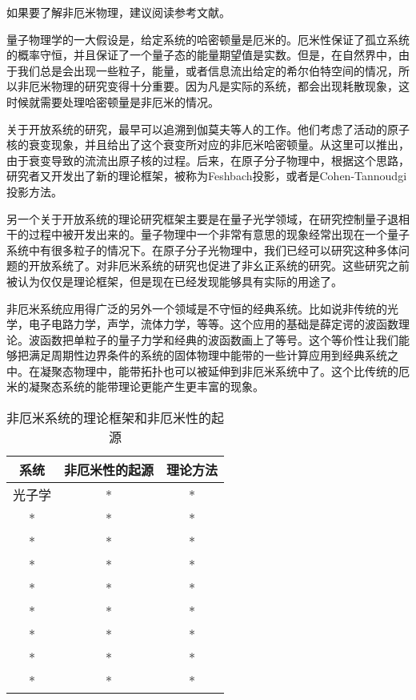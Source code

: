 
如果要了解非厄米物理，建议阅读参考文献\cite{Ashida:2020dkc}。

量子物理学的一大假设是，给定系统的哈密顿量是厄米的。厄米性保证了孤立系统的概率守恒，并且保证了一个量子态的能量期望值是实数。但是，在自然界中，由于我们总是会出现一些粒子，能量，或者信息流出给定的希尔伯特空间的情况，所以非厄米物理的研究变得十分重要。因为凡是实际的系统，都会出现耗散现象，这时候就需要处理哈密顿量是非厄米的情况。

关于开放系统的研究，最早可以追溯到伽莫夫等人的工作。他们考虑了活动的原子核的衰变现象，并且给出了这个衰变所对应的非厄米哈密顿量。从这里可以推出，由于衰变导致的流流出原子核的过程。后来，在原子分子物理中，根据这个思路，研究者又开发出了新的理论框架，被称为Feshbach投影，或者是Cohen-Tannoudgi投影方法。

另一个关于开放系统的理论研究框架主要是在量子光学领域，在研究控制量子退相干的过程中被开发出来的。量子物理中一个非常有意思的现象经常出现在一个量子系统中有很多粒子的情况下。在原子分子光物理中，我们已经可以研究这种多体问题的开放系统了。对非厄米系统的研究也促进了非幺正系统的研究。这些研究之前被认为仅仅是理论框架，但是现在已经发现能够具有实际的用途了。

非厄米系统应用得广泛的另外一个领域是不守恒的经典系统。比如说非传统的光学，电子电路力学，声学，流体力学，等等。这个应用的基础是薛定谔的波函数理论。波函数把单粒子的量子力学和经典的波函数画上了等号。这个等价性让我们能够把满足周期性边界条件的系统的固体物理中能带的一些计算应用到经典系统之中。在凝聚态物理中，能带拓扑也可以被延伸到非厄米系统中了。这个比传统的厄米的凝聚态系统的能带理论更能产生更丰富的现象。

\begin{table}[ht]
\centering
\caption{非厄米系统的理论框架和非厄米性的起源}\label{tab_nonHer1}
\begin{tabular}{|c|c|c|}
\hline
系统 & 非厄米性的起源 & 理论方法 \\
\hline
光子学 & * & * \\
\hline
* & * & * \\
\hline
* & * & * \\
\hline
* & * & * \\
\hline
* & * & * \\
\hline
* & * & * \\
\hline
* & * & * \\
\hline
* & * & * \\
\hline
* & * & * \\
\hline
\end{tabular}
\end{table}

